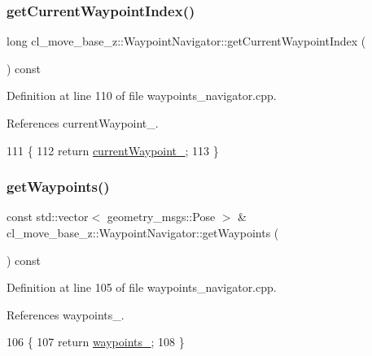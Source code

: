 \subsubsection{\texorpdfstring{get\+Current\+Waypoint\+Index()}{getCurrentWaypointIndex()}}
{\footnotesize\ttfamily long cl\+\_\+move\+\_\+base\+\_\+z\+::\+Waypoint\+Navigator\+::get\+Current\+Waypoint\+Index (\begin{DoxyParamCaption}{ }\end{DoxyParamCaption}) const}



Definition at line 110 of file waypoints\+\_\+navigator.\+cpp.



References current\+Waypoint\+\_\+.


\begin{DoxyCode}
111 \{
112   \textcolor{keywordflow}{return} \hyperlink{classcl__move__base__z_1_1WaypointNavigator_a82859e418592c2392c20a2d11b9836eb}{currentWaypoint\_};
113 \}
\end{DoxyCode}
\mbox{\label{classcl__move__base__z_1_1WaypointNavigator_a553cdd4ddc20ff26c1bdcb6dad42911f}} 
\subsubsection{\texorpdfstring{get\+Waypoints()}{getWaypoints()}}
{\footnotesize\ttfamily const std\+::vector$<$ geometry\+\_\+msgs\+::\+Pose $>$ \& cl\+\_\+move\+\_\+base\+\_\+z\+::\+Waypoint\+Navigator\+::get\+Waypoints (\begin{DoxyParamCaption}{ }\end{DoxyParamCaption}) const}



Definition at line 105 of file waypoints\+\_\+navigator.\+cpp.



References waypoints\+\_\+.


\begin{DoxyCode}
106 \{
107   \textcolor{keywordflow}{return} \hyperlink{classcl__move__base__z_1_1WaypointNavigator_a727f6a73e15ff5dc6bb3ffdf52c3d832}{waypoints\_};
108 \}
\end{DoxyCode}
\mbox{\label{classcl__move__base__z_1_1WaypointNavigator_a5d40e7942620c3c191e2a3bd75845069}} 
